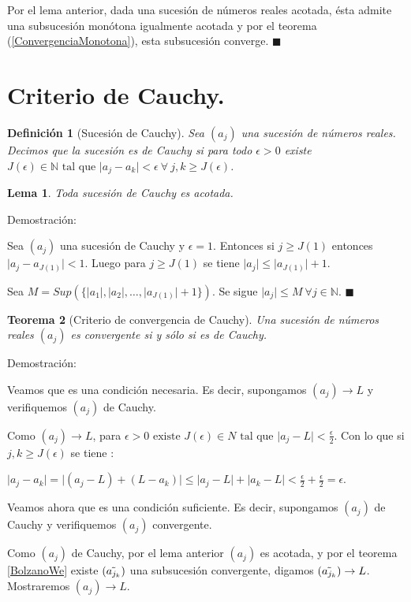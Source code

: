 \documentclass[12pt]{book}
\newcommand\N{{\mathbb N}}
\providecommand{\abs}[1]{\lvert#1\rvert}
\newtheorem{teo}{Teorema}[section]
\newtheorem{lema}[teo]{Lema}
\newtheorem{defi}{Definición}[section]
\begin{document}
Por el lema anterior, dada una sucesión de números reales acotada, ésta admite una subsucesión monótona igualmente acotada y por el teorema (\ref{ConvergenciaMonotona}), esta subsucesión converge. $\blacksquare$

\section{Criterio de Cauchy.}
\begin{defi}[Sucesión de Cauchy]\rm
Sea $(a_j)$ una sucesión de números reales. Decimos que la sucesión es de Cauchy si para todo $\epsilon>0$ existe $J(\epsilon) \in \N \mbox{ tal que } \abs{a_j-a_k}< \epsilon \ \forall \ j,k \ge J(\epsilon)$. 
\end{defi}

\begin{lema}\rm
Toda sucesión de Cauchy es acotada.
\end{lema}
Demostración:

Sea $(a_j)$ una sucesión de Cauchy y $\epsilon=1$. Entonces si $j \ge J(1)$ entonces $\abs{a_j-a_{J(1)}}<1$. Luego para $j \ge J(1)$ se tiene $\abs{a_j} \le \abs{a_{J(1)}}+1$.

Sea $M=Sup(\{ \abs{a_1},\abs{a_2}, \dots , \abs{a_{J(1)}}+1 \})$. Se sigue $\abs{a_j} \le M \ \forall{j \in \N}$. $\blacksquare$
\begin{teo}[Criterio de convergencia de Cauchy]\rm
Una sucesión de números reales $(a_j)$ es convergente si y sólo si es de Cauchy.
\end{teo}
Demostración:

Veamos que es una condición necesaria. Es decir, supongamos $(a_j) \rightarrow L$ y verifiquemos $(a_j)$ de Cauchy.

Como $(a_j) \rightarrow L$, para $\epsilon >0 \mbox{ existe } J(\epsilon) \in N \mbox{ tal que } \abs{a_j-L} < \frac{\epsilon}{2}$. Con lo que si $j,k \ge J(\epsilon)$ se tiene :

$\abs{a_j-a_k}=\abs{(a_j-L)+(L-a_k)} \le \abs{a_j-L}+\abs{a_k-L} < \frac{\epsilon}{2}+\frac{\epsilon}{2}=\epsilon$.

Veamos ahora que es una condición suficiente. Es decir, supongamos $(a_j)$ de Cauchy y verifiquemos $(a_j)$ convergente.

Como $(a_j)$ de Cauchy, por el lema anterior $(a_j)$ es acotada, y por el teorema \ref{BolzanoWe} existe $(\Tilde{a_{j_k}})$ una subsucesión convergente, digamos $(\Tilde{a_{j_k}}) \rightarrow L$. Mostraremos $(a_j) \rightarrow L$.
\end{document}
